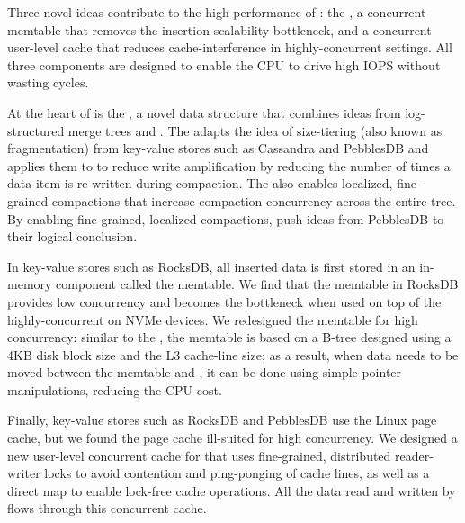 Three novel ideas contribute to the high performance of \sysname: the
\emph{\datastruct}, a concurrent memtable that removes the insertion
scalability bottleneck, and a concurrent user-level cache that reduces
cache-interference in highly-concurrent settings.  All three components are
designed to enable the CPU to drive high IOPS without wasting cycles.

At the heart of \sysname is the \datastruct, a novel data structure that
combines ideas from log-structured merge trees and \bets.  The \datastruct
adapts the idea of size-tiering (also known as fragmentation) from key-value
stores such as Cassandra and PebblesDB and applies them to \bets to reduce
write amplification by reducing the number of times a data item is re-written
during compaction.  The \datastruct also enables localized, fine-grained
compactions that increase compaction concurrency across the entire tree.  By
enabling fine-grained, localized compactions, \datastructs push ideas from
PebblesDB to their logical conclusion.

In key-value stores such as RocksDB, all inserted data is first stored in an
in-memory component called the memtable. We find that the memtable in RocksDB
provides low concurrency and becomes the bottleneck when used on top of the
highly-concurrent \datastruct on NVMe devices. We redesigned the memtable for
high concurrency: similar to the \datastruct, the \sysname memtable is based on
a B-tree designed using a 4KB disk block size and the L3 cache-line size; as a
result, when data needs to be moved between the memtable and \datastruct, it
can be done using simple pointer manipulations, reducing the CPU cost.

Finally, key-value stores such as RocksDB and PebblesDB use the Linux page
cache, but we found the page cache ill-suited for high concurrency.  We
designed a new user-level concurrent cache for \sysname that uses fine-grained,
distributed reader-writer locks to avoid contention and ping-ponging of cache
lines, as well as a direct map to enable lock-free cache operations. All the
data read and written by \sysname flows through this concurrent cache.


